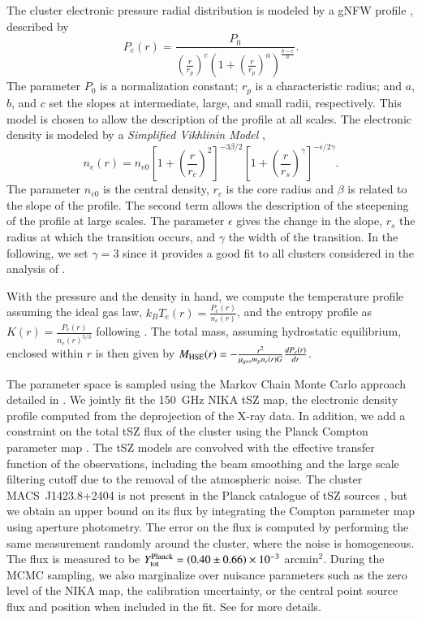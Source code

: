 \documentclass[twocolumn,traditabstract]{aa}
\begin{document}
The cluster electronic pressure radial distribution is modeled by a gNFW profile \citep{nagai2007}, described by
\begin{equation}
	P_e(r) = \frac{P_0}{\left(\frac{r}{r_p}\right)^c \left(1+\left(\frac{r}{r_p}\right)^a\right)^{\frac{b-c}{a}}}.
\label{eq:gNFW}
\end{equation}
The parameter $P_0$ is a normalization constant; $r_p$ is a characteristic radius; and $a$, $b$, and $c$ set the slopes at intermediate, large, and small radii, respectively. This model is chosen to allow the description of the profile at all scales. The electronic density is modeled by a \emph{Simplified Vikhlinin Model} \citep{vikhlinin2006},
\begin{equation}
	n_e(r) = n_{e0} \left[1+\left(\frac{r}{r_c}\right)^2 \right]^{-3 \beta /2} \left[ 1+\left(\frac{r}{r_s}\right)^{\gamma} \right]^{-\epsilon/2 \gamma}.
\label{eq:SVM}
\end{equation}
The parameter $n_{e0}$ is the central density, $r_c$ is the core radius and $\beta$ is related to the slope of the profile. The second term allows the description of the steepening of the profile at large scales. The parameter $\epsilon$ gives the change in the slope, $r_s$ the radius at which the transition occurs, and $\gamma$ the width of the transition. In the following, we set $\gamma = 3$ since it provides a good fit to all clusters considered in the analysis of \cite{vikhlinin2006}.

With the pressure and the density in hand, we compute the temperature profile assuming the ideal gas law, $k_B T_e(r) = \frac{P_e(r)}{n_e(r)}$, and the entropy profile as $K(r) =  \frac{P_e(r)}{n_e(r)^{5/3}}$ following \cite{voit2005}. The total mass, assuming hydrostatic equilibrium, enclosed within $r$ is then given by $M_{\rm HSE}(r) = -\frac{r^2}{\mu_{gas} m_p n_e(r) G} \frac{dP_e(r)}{dr}$.

The parameter space is sampled using the Markov Chain Monte Carlo approach detailed in \cite{adam2014}. We jointly fit the 150~GHz NIKA tSZ map, the electronic density profile computed from the deprojection of the X-ray data. In addition, we add a constraint on the total tSZ flux of the cluster using the Planck Compton parameter map \citep{planck2015XXII}. The tSZ models are convolved with the effective transfer function of the observations, including the beam smoothing and the large scale filtering cutoff due to the removal of the atmospheric noise. The cluster \mbox{MACS~J1423.8+2404} is not present in the Planck catalogue of tSZ sources \citep{planck2015XXVII}, but we obtain an upper bound on its flux by integrating the Compton parameter map \citep{planck2015XXII} using aperture photometry. The error on the flux is computed by performing the same measurement randomly around the cluster, where the noise is homogeneous. The flux is measured to be $Y_{\rm tot}^{\rm Planck} = \left(0.40 \pm 0.66\right) \times 10^{-3}$ arcmin$^2$. During the MCMC sampling, we also marginalize over nuisance parameters such as the zero level of the NIKA map, the calibration uncertainty, or the central point source flux and position when included in the fit. See \cite{adam2014} for more details.
\end{document}
